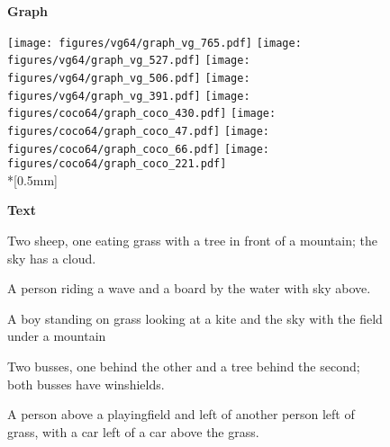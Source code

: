 \documentclass[10pt,twocolumn,letterpaper]{article}
\begin{document}
\newlength{\qualtextspace}
\setlength{\qualtextspace}{0.005\textwidth}
\begin{figure*}[ht!]
  \centering
  \begin{rotate}{90}
    \textbf{Graph}
  \end{rotate}
  \hspace*{0.5mm}
  \texttt{[image: figures/vg64/graph\_vg\_765.pdf]}
  \texttt{[image: figures/vg64/graph\_vg\_527.pdf]}
  \texttt{[image: figures/vg64/graph\_vg\_506.pdf]}
  \texttt{[image: figures/vg64/graph\_vg\_391.pdf]}
  \texttt{[image: figures/coco64/graph\_coco\_430.pdf]}
  \texttt{[image: figures/coco64/graph\_coco\_47.pdf]}
  \texttt{[image: figures/coco64/graph\_coco\_66.pdf]}
  \texttt{[image: figures/coco64/graph\_coco\_221.pdf]} \\*[0.5mm]
  \begin{rotate}{90}
    \hspace{-2.5mm}\textbf{Text}
  \end{rotate}
  \hspace{\qualtextspace}
  \begin{minipage}{\qualtext}
    \ssmall
    Two sheep, one eating grass with a tree in front of a mountain;
    the sky has a cloud.
  \end{minipage}
  \hspace{\qualtextspace}
  \begin{minipage}{\qualtext}
    \ssmall
    A person riding a wave and a board by the water with sky above.
  \end{minipage}
  \hspace{\qualtextspace}
  \begin{minipage}{\qualtext}
    \ssmall
    A boy standing on grass looking at a kite and the sky with
    the field under a mountain
  \end{minipage}
  \hspace{\qualtextspace}
  \begin{minipage}{\qualtext}
    \ssmall
    Two busses, one behind the other and a tree behind the second;
    both busses have winshields.
  \end{minipage}
  \hspace{\qualtextspace}
  \begin{minipage}{\qualtext}
    \ssmall
    A person above a playingfield and left of another person left of grass,
    with a car left of a car above the grass.
  \end{minipage}

\end{figure*}
\end{document}
